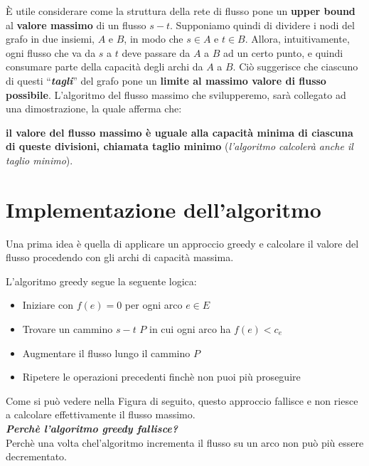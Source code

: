 È utile considerare come la struttura della rete di flusso pone un
\textbf{upper bound} al \textbf{valore massimo} di un flusso $s-t$.
Supponiamo quindi di dividere i nodi del grafo in due insiemi, $A$ e
$B$, in modo che $s \in A$ e $t \in B$. Allora, intuitivamente,
ogni flusso che va da $s$ a $t$ deve passare da $A$ a $B$ ad un
certo punto, e quindi consumare parte della capacità degli archi da
$A$ a $B$. Ciò suggerisce che ciascuno di questi
``\textbf{\emph{tagli}}'' del grafo pone un \textbf{limite al massimo
	valore di flusso possibile}. L'algoritmo del flusso massimo che
svilupperemo, sarà collegato ad una dimostrazione, la quale afferma che:
\begin{myblockquote}
	\textbf{il valore del flusso massimo è uguale alla
		capacità minima di ciascuna di queste divisioni, chiamata taglio minimo}
	(\emph{l'algoritmo calcolerà anche il taglio minimo}).
\end{myblockquote}



\section{Implementazione dell'algoritmo}

Una prima idea è quella di applicare un approccio greedy e calcolare il
valore del flusso procedendo con gli archi di capacità massima.

L'algoritmo greedy segue la seguente logica:
\begin{itemize}
	\item Iniziare con $f(e) = 0$ per ogni arco $e \in E$
	\item Trovare un cammino $s-t$ $P$ in cui ogni arco ha $f(e) < c_e$
	\item Augmentare il flusso lungo il cammino $P$
	\item Ripetere le operazioni precedenti finchè non puoi più proseguire
\end{itemize}

Come si può vedere nella Figura di seguito, questo approccio fallisce e
non riesce a calcolare effettivamente il flusso massimo.\\

\textbf{\emph{Perchè l'algoritmo greedy fallisce?}}\\
Perchè una volta chel'algoritmo incrementa il flusso su un arco non
può più essere decrementato.

